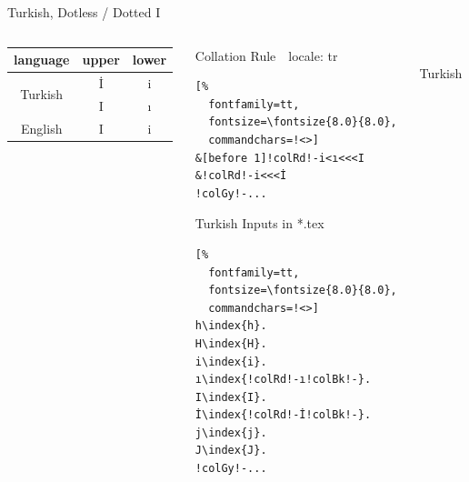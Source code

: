 \documentclass[aspectratio=169,10pt]{beamer}
\begin{document}
\begin{frame}[fragile]{Turkish, Dotless / Dotted I}

\begin{columns}
\begin{column}{47mm}
\setmainfont{Noto Serif}
\setsansfont{Noto Sans}
\normalsize
\begin{tabular}{c|cc}
language & upper & lower \\\hline\hline
\multirow{2}{*}{Turkish}
        & İ & i \\
        & I & ı \\\hline
English & I & i \\
\end{tabular}
\end{column}

\begin{column}{40mm}
\setmonofont{Noto Sans Mono}
\begin{block}{Collation Rule~~\scriptsize locale: tr}
\begin{Verbatim}[%
  fontfamily=tt,
  fontsize=\fontsize{8.0}{8.0},
  commandchars=!<>]
&[before 1]!colRd!-i<ı<<<I
&!colRd!-i<<<İ
!colGy!-...
\end{Verbatim}
\end{block}
\begin{exampleblock}{Turkish Inputs in *.tex}
\begin{Verbatim}[%
  fontfamily=tt,
  fontsize=\fontsize{8.0}{8.0},
  commandchars=!<>]
h\index{h}.
H\index{H}.
i\index{i}.
ı\index{!colRd!-ı!colBk!-}.
I\index{I}.
İ\index{!colRd!-İ!colBk!-}.
j\index{j}.
J\index{J}.
!colGy!-...
\end{Verbatim}
\end{exampleblock}
\end{column}

\begin{column}{43mm}
\begin{center}
\\[2mm]%
Turkish
\end{center}
\end{column}
\end{columns}

\end{frame}

\end{document}
